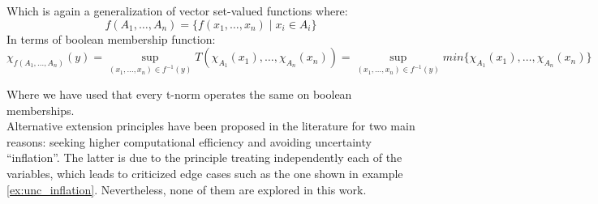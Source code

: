 Which is again a generalization of vector set-valued functions where: $$f(A_1,\ldots,A_n)= \{f(x_1,\ldots,x_n)\mid x_i\in A_i\}$$
In terms of boolean membership function:
$$\chi _{f(A_1,\ldots,A_n)}(y)=\sup_{(x_1,\ldots,x_n)\in f^{-1}(y)}T(\chi_{A_1}(x_1),\ldots,\chi_{A_n}(x_n)) = \sup_{(x_1,\ldots,x_n)\in f^{-1}(y)}min\{\chi_{A_1}(x_1),\ldots,\chi_{A_n}(x_n)\}$$

Where we have used that every t-norm operates the same on boolean memberships.\\

Alternative extension principles have been proposed in the literature for two main reasons: seeking higher computational efficiency and avoiding uncertainty ``inflation''. The latter is due to the principle treating independently each of the variables, which leads to criticized edge cases such as the one shown in example \ref{ex:unc_inflation}. Nevertheless, none of them are explored in this work.